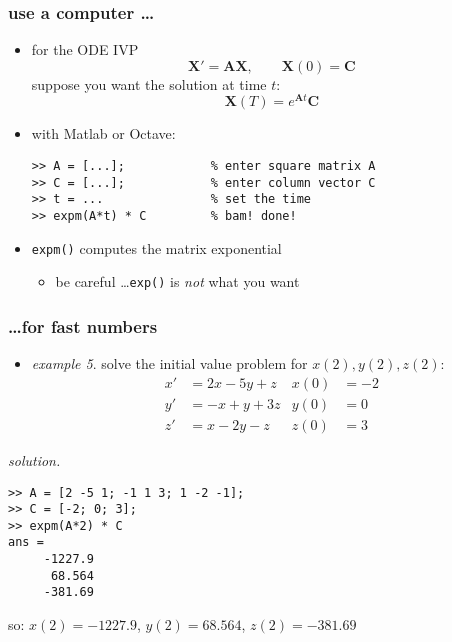 \documentclass[dvipsnames,colorlinks]{beamer}
\newcommand{\bA}{\mathbf{A}}
\newcommand{\bC}{\mathbf{C}}
\newcommand{\bX}{\mathbf{X}}
\begin{document}
\begin{frame}[fragile]
\frametitle{use a computer \dots}

\begin{itemize}
\item for the ODE IVP
$$\bX' = \bA \bX, \qquad \bX(0)=\bC$$
suppose you want the solution at time $t$:
    $$\bX(T) = e^{\bA t} \bC$$

\medskip
\item with Matlab or Octave:
\begin{Verbatim}[fontsize=\small]
>> A = [...];            % enter square matrix A
>> C = [...];            % enter column vector C
>> t = ...               % set the time
>> expm(A*t) * C         % bam! done!
\end{Verbatim}

\medskip
\item \texttt{expm()} computes the matrix exponential
    \begin{itemize}
    \item be careful \dots \texttt{exp()} is \emph{not} what you want
    \end{itemize}
\end{itemize}
\end{frame}


\begin{frame}[fragile]
\frametitle{\dots for fast numbers}

\begin{itemize}
\item \emph{example 5}.  solve the initial value problem for $x(2),y(2),z(2)$:
\begin{align*}
x' &= 2 x - 5 y + z & x(0)&=-2 \\
y' &= - x + y + 3 z & y(0)&=0 \\
z' &= x - 2 y - z   & z(0)&=3
\end{align*}
\end{itemize}

\noindent \emph{solution.}
\begin{Verbatim}[fontsize=\small]
>> A = [2 -5 1; -1 1 3; 1 -2 -1];
>> C = [-2; 0; 3];
>> expm(A*2) * C
ans =
     -1227.9
      68.564
     -381.69
\end{Verbatim}

\medskip
so: \quad $x(2)=-1227.9$, $y(2)=68.564$, $z(2)=-381.69$
\end{frame}
\end{document}
